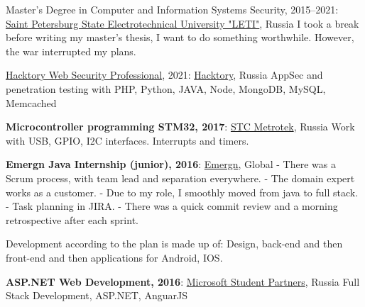 \documentclass{yb}
\begin{document}
\begin{samepage}

Master's Degree in Computer and Information Systems Security, 2015--2021:\newline
\href{https://etu.ru/en/university/}{Saint Petersburg State Electrotechnical University "LETI"}, Russia\newline
I took a break before writing my master's thesis, I want to do something worthwhile. However, the war interrupted my plans.

\href{https://app.hacktory.ai/certificates/ca203296-188e-4df4-9308-4d4cb08e8b9f}{Hacktory Web Security Professional}, 2021:\newline
\href{https://hacktory.ai/}{Hacktory}, Russia\newline
AppSec and penetration testing with PHP, Python, JAVA, Node, MongoDB, MySQL, Memcached

\textbf{Microcontroller programming STM32, 2017}:\newline
\href{https://stc.metrotek.ru/}{STC Metrotek}, Russia\newline
Work with USB, GPIO, I2C interfaces. Interrupts and timers.

\textbf{Emergn Java Internship (junior), 2016}:\newline
\href{https://www.emergn.com/}{Emergn}, Global
\newline - There was a Scrum process, with team lead and separation everywhere.
\newline - The domain expert works as a customer.
\newline - Due to my role, I smoothly moved from java to full stack.
\newline - Task planning in JIRA.
\newline - There was a quick commit review and a morning retrospective after each
sprint.

Development according to the plan is made up of: Design, back-end and then front-end and then applications for Android, IOS.


\textbf{ASP.NET Web Development, 2016}:\newline
\href{https://studentambassadors.microsoft.com/en-en}{Microsoft Student Partners}, Russia\newline
Full Stack Development, ASP.NET, AnguarJS\newline


\end{samepage}
\end{document}
